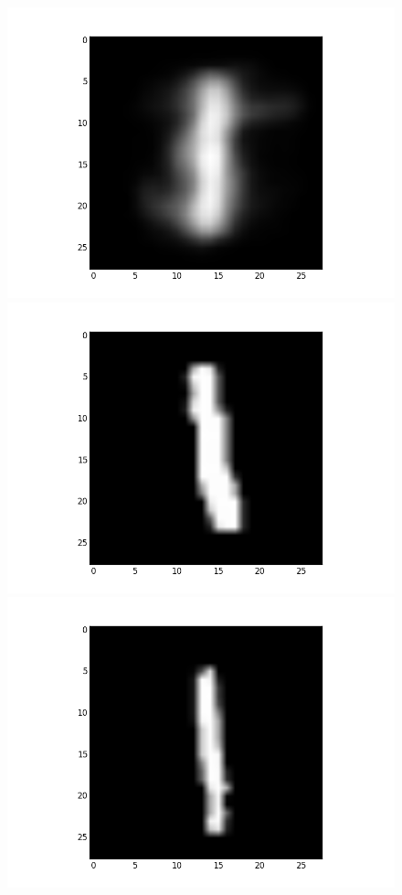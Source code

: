 \documentclass[submit]{harvardml}
\begin{document}
\begin{figure}[ht]
    \centering
    \includegraphics[scale=0.20]{mean-8}
    \includegraphics[scale=0.20]{representative-8-0}
    \includegraphics[scale=0.20]{representative-8-1}

\end{figure}
\end{document}
